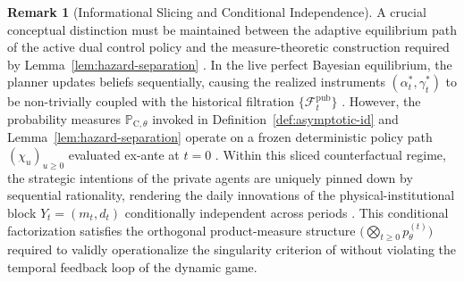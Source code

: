 \documentclass[12pt]{article}
\numberwithin{equation}{section}
\numberwithin{table}{section}
\theoremstyle{definition}
\newtheorem{remark}[theorem]{Remark}
\newcommand{\ProbC}[1]{\mathbb{P}_{\mathrm{C},#1}}
\begin{document}
\begin{remark}[Informational Slicing and Conditional Independence]\label{rem:info-slicing}
A crucial conceptual distinction must be maintained between the adaptive
equilibrium path of the active dual control policy and the measure-theoretic
construction required by Lemma~\ref{lem:hazard-separation}
\citep{Kakutani1948, BlackwellDubins1962}. In the live perfect Bayesian
equilibrium, the planner updates beliefs sequentially, causing the realized
instruments $(\alpha_t^*, \gamma_t^*)$ to be non-trivially coupled with the
historical filtration $\{\mathcal{F}_t^{\mathrm{pub}}\}$
\citep{AghionBoltonHarrisJullien1991, EasleyKiefer1988}. However, the
probability measures $\ProbC{\theta}$ invoked in
Definition~\ref{def:asymptotic-id} and Lemma~\ref{lem:hazard-separation}
operate on a frozen deterministic policy path $(\chi_u)_{u \ge 0}$ evaluated
ex-ante at $t=0$ \citep{BlackwellDubins1962}. Within this sliced
counterfactual regime, the strategic intentions of the private agents are
uniquely pinned down by sequential rationality, rendering the daily innovations
of the physical-institutional block $Y_t = (m_t, d_t)$ conditionally
independent across periods \citep{Kakutani1948}. This conditional factorization
satisfies the orthogonal product-measure structure
$\bigl(\bigotimes_{t \ge 0} p_{\theta}^{(t)}\bigr)$ required to validly
operationalize the singularity criterion of \citet{Kakutani1948} without
violating the temporal feedback loop of the dynamic game.
\end{remark}
\end{document}
